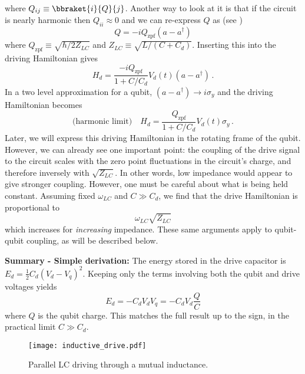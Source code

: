 where $Q_{ij} \equiv \bbraket{i}{Q}{j}$.
Another way to look at it is that if the circuit is nearly harmonic then $Q_{ii}\approx 0$ and we can re-express $Q$ as (see \citeinternaltype {})
\begin{equation}
Q = -iQ_{\textrm{zpf}}(a-a^{\dagger})
\end{equation}
where $Q_{\textrm{zpf}}\equiv \sqrt{\hbar/2Z_{LC}}$ and $Z_{LC} \equiv \sqrt{L/(C+C_d)}$.
Inserting this into the driving Hamiltonian gives
\begin{equation}
H_d = \frac{-iQ_{\textrm{zpf}}}{1+C/C_d}V_d(t) (a-a^{\dagger}) \, .
\end{equation}
In a two level approximation for a qubit, $(a-a^{\dagger}) \rightarrow i \sigma_y$ and the driving Hamiltonian becomes \begin{equation}
\text{(harmonic limit)} \quad H_d = \frac{Q_{\textrm{zpf}}}{1+C/C_d}V_d(t) \sigma_y \, . \label{eq:drivingHamiltonianLabFrame}
\end{equation}
Later, we will express this driving Hamiltonian in the rotating frame of the qubit.
However, we can already see one important point: the coupling of the drive signal to the circuit scales with the zero point fluctuations in the circuit's charge, and therefore inversely with $\sqrt{Z_{LC}}$.
In other words, low impedance would appear to give stronger coupling.
However, one must be careful about what is being held constant.
Assuming fixed $\omega_{LC}$ and $C \gg C_d$, we find that the drive Hamiltonian is proportional to
\begin{equation}
\omega_{LC} \sqrt{Z_{LC}}
\end{equation}
which increases for \emph{increasing} impedance.
These same arguments apply to qubit-qubit coupling, as will be described below.

\textbf{Summary - Simple derivation:} The energy stored in the drive capacitor is $E_d = \frac{1}{2}C_d\left( V_d - V_q \right)^2$.
Keeping only the terms involving both the qubit and drive voltages yields \begin{equation}
E_d = - C_d V_d V_q = - C_d V_d \frac{Q}{C} \end{equation}
where $Q$ is the qubit charge.
This matches the full result up to the sign, in the practical limit $C \gg C_d$.



\begin{figure}
\begin{centering}
\texttt{[image: inductive\_drive.pdf]}
\par\end{centering}
  \caption{Parallel LC driving through a mutual inductance.}
\label{fig:qubits.inductive_drive}
\end{figure}

